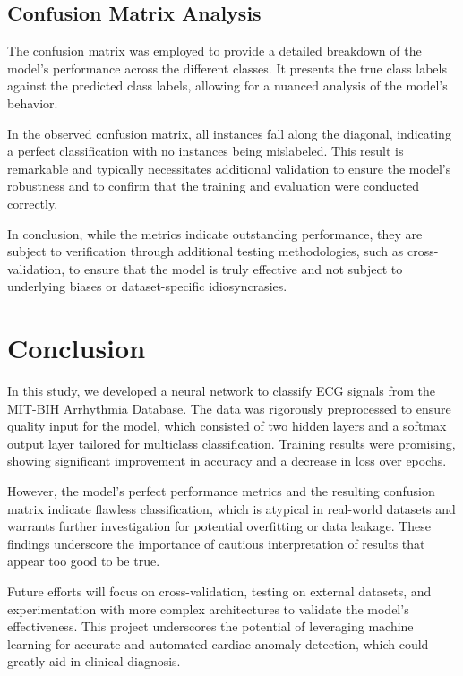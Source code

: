 \documentclass{report}
\begin{document}
\subsection{Confusion Matrix Analysis}

The confusion matrix was employed to provide a detailed breakdown of the model's performance across the different classes. It presents the true class labels against the predicted class labels, allowing for a nuanced analysis of the model's behavior.

In the observed confusion matrix, all instances fall along the diagonal, indicating a perfect classification with no instances being mislabeled. This result is remarkable and typically necessitates additional validation to ensure the model's robustness and to confirm that the training and evaluation were conducted correctly.

In conclusion, while the metrics indicate outstanding performance, they are subject to verification through additional testing methodologies, such as cross-validation, to ensure that the model is truly effective and not subject to underlying biases or dataset-specific idiosyncrasies.


\section{Conclusion}

In this study, we developed a neural network to classify ECG signals from the MIT-BIH Arrhythmia Database. The data was rigorously preprocessed to ensure quality input for the model, which consisted of two hidden layers and a softmax output layer tailored for multiclass classification. Training results were promising, showing significant improvement in accuracy and a decrease in loss over epochs.

However, the model's perfect performance metrics and the resulting confusion matrix indicate flawless classification, which is atypical in real-world datasets and warrants further investigation for potential overfitting or data leakage. These findings underscore the importance of cautious interpretation of results that appear too good to be true.

Future efforts will focus on cross-validation, testing on external datasets, and experimentation with more complex architectures to validate the model's effectiveness. This project underscores the potential of leveraging machine learning for accurate and automated cardiac anomaly detection, which could greatly aid in clinical diagnosis.
\end{document}
